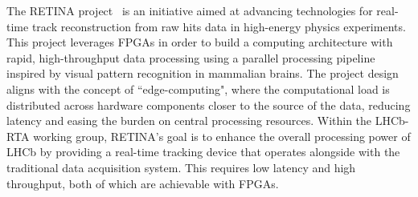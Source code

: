 The RETINA project~\cite{Lazzari:2801062} is an initiative aimed at advancing technologies for real-time track reconstruction from raw hits data in high-energy physics experiments. This project leverages FPGAs in order to build a computing architecture with rapid, high-throughput data processing using a parallel processing pipeline inspired by visual pattern recognition in mammalian brains. The project design aligns with the concept of ``edge-computing", where the computational load is distributed across hardware components closer to the source of the data, reducing latency and easing the burden on central processing resources.
Within the LHCb-RTA working group, RETINA’s goal is to enhance the overall processing power of LHCb by providing a real-time tracking device that operates alongside with the traditional data acquisition system. This requires low latency and high throughput, both of which are achievable with FPGAs. 


